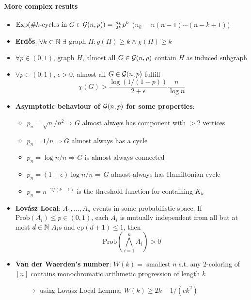 \paragraph{More complex results}
\begin{itemize}
  \item \( \text{Exp}(\# k \text{-cycles in } G \in \mathcal{G}(n,p)) = \frac{n_k}{2k}p^k \) (\( n_k = n(n-1)\cdots (n-k+1) \))
  \item \textbf{Erd\H{o}s}: \( \forall k \in \mathbb{N} \ \exists \) graph \( H : g(H) \geq k \wedge \chi(H) \geq k \)
  \item \( \forall p \in (0,1) \), graph \( H \), almost all \( G \in \mathcal{G}(n,p) \) contain \( H \) as induced subgraph
  \item \( \forall p \in (0,1) \), \( \epsilon > 0 \), almost all \( G \in \mathcal{G}(n,p) \) fulfill
  \begin{equation*}
    \chi(G) > \frac{\log(1/(1-p))}{2+\epsilon}\frac{n}{\log n}
  \end{equation*}
  \item \textbf{Asymptotic behaviour of \( \mathcal{G}(n,p) \) for some properties}:
  \begin{itemize}
    \item \( p_n = \sqrt{n}/n^2 \Rightarrow G \) almost always has component with \( > 2 \) vertices
    \item \( p_n = 1/n \Rightarrow G \) almost always has a cycle
    \item \( p_n = \log n/n \Rightarrow G \) is almost always connected
    \item \( p_n = (1+\epsilon)\log n/n \Rightarrow G \) almost always has Hamiltonian cycle
    \item \( p_n = n^{-2/(k-1)} \) is the threshold function for containing \( K_k \)
  \end{itemize}
  \item \textbf{Lovász Local}: \( A_1,\dots,A_n \) events in some probabilistic space. If \( \text{Prob}(A_i) \leq p \in (0,1) \), each \( A_i \) is mutually independent from all but at most \( d \in \mathbb{N} \ A_i \)s and \( \text{ep}(d+1) \leq 1 \), then
  \begin{equation*}
    \text{Prob}\left( \bigwedge_{i=1}^n \overline{A_i} \right) > 0
  \end{equation*}
  \item \textbf{Van der Waerden's number}: \( W(k) = \) smallest \( n \) s.t. any \( 2 \)-coloring of \( [n] \) contains monochromatic arithmetic progression of length \( k \)
  \begin{itemize}
    \item[\( \to \)] using Lovász Local Lemma: \( W(k) \geq 2{k-1}/(ek^2) \)
  \end{itemize}
\end{itemize}
